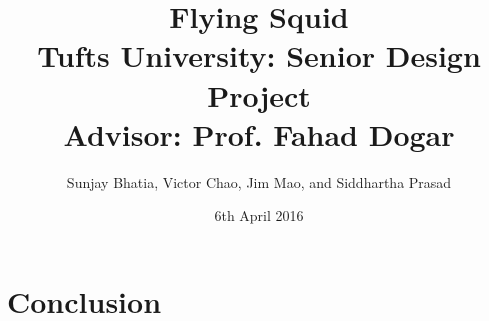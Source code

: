 \documentclass {article}
\title {
	{Flying Squid\\[0.4in]}
	{Tufts University: Senior Design Project\\[0.2in]}
	{\large Advisor: Prof. Fahad Dogar\\}
}
\author {Sunjay Bhatia, Victor Chao, Jim Mao, and Siddhartha Prasad}
\date{6th April 2016}
\begin{document}
\maketitle

\tableofcontents
\pagebreak







\section{Conclusion}

\printbibliography
\end{document}
